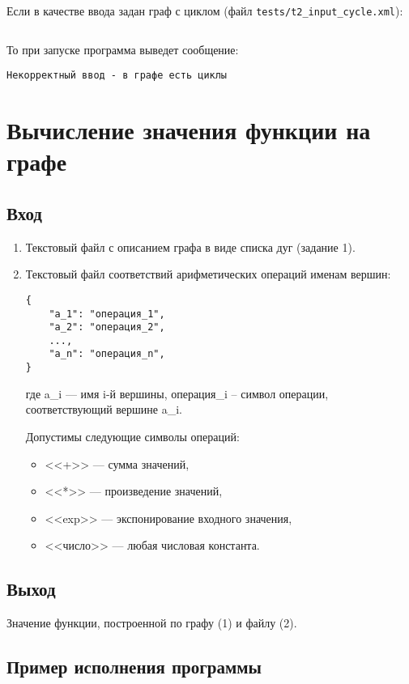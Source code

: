 \documentclass[spec, och, labwork]{SCWorks}
\begin{document}
Если в качестве ввода задан граф с циклом (файл \verb|tests/t2_input_cycle.xml|):
\inputminted{xml}{../tests/t2_input_cycle.xml}

То при запуске программа выведет сообщение:
\begin{verbatim}
Некорректный ввод - в графе есть циклы
\end{verbatim}


\section{Вычисление значения функции на графе}



\subsection*{Вход}

\begin{enumerate}
  \item
    Текстовый файл с описанием графа в виде списка дуг (задание 1).
  \item
    Текстовый файл соответствий арифметических операций именам вершин:
    \begin{verbatim}
{
    "a_1": "операция_1",
    "a_2": "операция_2",
    ...,
    "a_n": "операция_n",
}
    \end{verbatim}
    где a_i --- имя i-й вершины, операция_i -- символ операции, соответствующий
    вершине a_i.

    Допустимы следующие символы операций:
    \begin{itemize}
      \item <<+>> --- сумма значений,
      \item <<*>> --- произведение значений,
      \item <<exp>> --- экспонирование входного значения,
      \item <<число>> --- любая числовая константа.
    \end{itemize}
\end{enumerate}

\subsection*{Выход}

Значение функции, построенной по графу (1) и файлу (2).

\subsection*{Пример исполнения программы}
\end{document}
